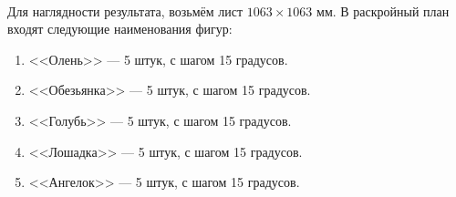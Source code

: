 \documentclass[14pt]{extarticle}
\begin{document}
	\paragraph{}
	Для наглядности результата, возьмём лист $1063\times1063$ мм. В раскройный план входят следующие наименования фигур:
	\begin{enumerate}
		\item <<Олень>> --- 5 штук, с шагом 15 градусов.
		\item <<Обезьянка>> --- 5 штук, с шагом 15 градусов.
		\item <<Голубь>> --- 5 штук, с шагом 15 градусов.
		\item <<Лошадка>> --- 5 штук, с шагом 15 градусов.
		\item <<Ангелок>> --- 5 штук, с шагом 15 градусов.
	\end{enumerate}
\end{document}
